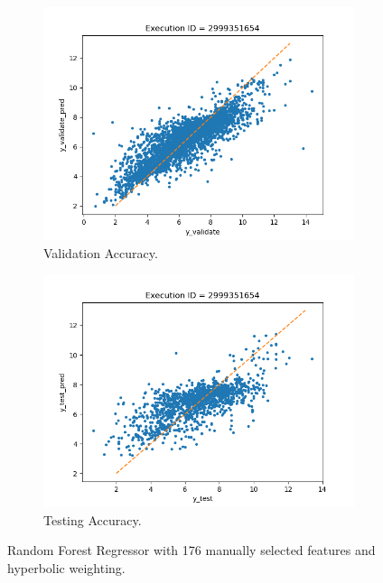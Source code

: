\documentclass[11pt]{article}
\begin{document}
\begin{figure}
     \centering
     \begin{subfigure}[b]{0.45\textwidth}
         \centering
         \includegraphics[scale=0.45]{images/accuracyRFRvalidate}
         \caption{Validation Accuracy.}
        \label{fig:accuracyRFRvalidate}
     \end{subfigure}
     \hfill
     \begin{subfigure}[b]{0.45\textwidth}
         \centering
         \includegraphics[scale=0.45]{images/accuracyRFRtest}
        \caption{Testing Accuracy.}
        \label{fig:accuracyRFRtest}
     \end{subfigure}
     \caption{Random Forest Regressor with 176 manually selected features and hyperbolic weighting.}
     \label{fig:RFMModel}
\end{figure}
\end{document}
